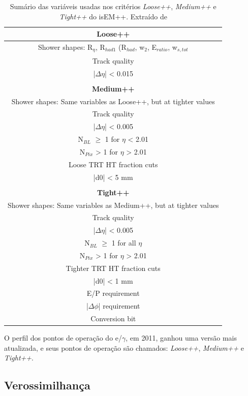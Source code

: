 \begin{table}
  \centering
  \caption{Sumário das variáveis usadas nos critérios \emph{Loose++}, \emph{Medium++} e \emph{Tight++} do isEM++. Extraído de \cite{alison2014road} }\label{tab:01}
\begin{tabular}{c}

\textbf{Loose++}	\\ 	\hline
Shower shapes: R${_\eta}$, R${_{had1}}$ (R${_{had}}$, w${_2}$, E${_{ratio}}$,  w${_{s,tot}}$	\\ 	
Track quality	\\ 	
|${\Delta\eta}$| < 0.015	\\ 	
	\\ 	
\textbf{Medium++}	\\ 	\hline
Shower shapes: Same variables as Loose++, but at tighter values	\\ 	
Track quality	\\ 	
|${\Delta\eta}$| < 0.005	\\ 	
N${_{BL}}$ $\ge$ 1 for ${\eta}$ < 2.01	\\ 	
N${_{Pix}}$ > 1 for ${\eta}$ > 2.01	\\ 	
Loose TRT HT fraction cuts	\\ 	
|d0| < 5 mm	\\ 	
	\\ 	
\textbf{Tight++}	\\ 	\hline
Shower shapes: Same variables as Medium++, but at tighter values	\\ 	
Track quality	\\ 	
|${\Delta\eta}$|  < 0.005	\\ 	
N${_{BL}}$ $\ge$ 1 for all ${\eta}$	\\ 	
N${_{Pix}}$ > 1 for ${\eta}$ > 2.01	\\ 	
Tighter TRT HT fraction cuts	\\ 	
|d0| < 1 mm	\\ 	
E/P requirement	\\ 	
|${\Delta\phi}$|   requirement	\\ 	
Conversion bit	\\ 	

	
\end{tabular}
\end{table}
	
O perfil dos pontos de operação do e/$\gamma$, em 2011,  ganhou uma versão mais atualizada, e seus pontos de operação são chamados: \emph{Loose++}, \emph{Medium++} e \emph{Tight++}.


\subsection{Verossimilhança} \label{sec:likelihood}

